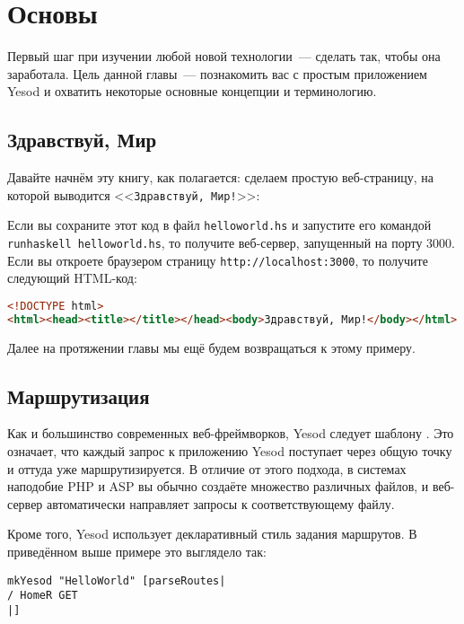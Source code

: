 \chapter{Основы}\label{chap:basics}

Первый шаг при изучении любой новой технологии~--- сделать так, чтобы она
заработала. Цель данной главы~--- познакомить вас с простым приложением Yesod и
охватить некоторые основные концепции и терминологию.

\section{Здравствуй, Мир}

Давайте начнём эту книгу, как полагается: сделаем простую веб-страницу, на
которой выводится <<\texttt{Здравствуй, Мир!}>>:

Если вы сохраните этот код в файл \lstinline!helloworld.hs! и запустите его
командой \lstinline!runhaskell helloworld.hs!, то получите веб-сервер,
запущенный на порту 3000.  Если вы откроете браузером страницу
\lstinline'http://localhost:3000', то получите следующий HTML-код:

\begin{lstlisting}[language=HTML]
<!DOCTYPE html>
<html><head><title></title></head><body>Здравствуй, Мир!</body></html>
\end{lstlisting}

Далее на протяжении главы мы ещё будем возвращаться к этому примеру.

\section{Маршрутизация}

Как и большинство современных веб-фреймворков, Yesod следует шаблону
.  Это означает, что каждый запрос к приложению Yesod
поступает через общую точку и оттуда уже маршрутизируется. В отличие от этого
подхода, в системах наподобие PHP и ASP вы обычно создаёте множество различных
файлов, и веб-сервер автоматически направляет запросы к соответствующему файлу.

Кроме того, Yesod использует декларативный стиль задания маршрутов. В
приведённом выше примере это выглядело так:

\begin{lstlisting}
mkYesod "HelloWorld" [parseRoutes|
/ HomeR GET
|]
\end{lstlisting}


